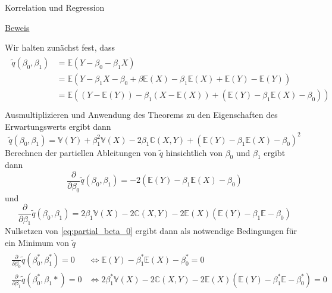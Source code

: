 \documentclass[
  8pt,
  ignorenonframetext,
]{beamer}
\begin{document}
\begin{frame}{Korrelation und Regression}
\protect\hypertarget{korrelation-und-regression-4}{}
\tiny
{}
\tiny
\setlength{\abovedisplayskip}{3pt}
\setlength{\belowdisplayskip}{3pt}

\underline{Beweis}

Wir halten zunächst fest, dass \begin{align}
\begin{split}
\tilde{q}(\beta_0,\beta_1)
& = \mathbb{E}\left(Y - \beta_0 - \beta_1 X \right) \\
& = \mathbb{E}\left(Y - \beta_1 X - \beta_0 + \beta\mathbb{E}(X) - \beta_1\mathbb{E}(X) + \mathbb{E}(Y) - \mathbb{E}(Y) \right) \\
& = \mathbb{E}\left((Y - \mathbb{E}(Y)) - \beta_1(X - \mathbb{E}(X)) + (\mathbb{E}(Y) - \beta_1\mathbb{E}(X) - \beta_0)\right) \\
\end{split}
\end{align} Ausmultiplizieren und Anwendung des Theorems zu den
Eigenschaften des Erwartungswerts ergibt dann \begin{equation}
\tilde{q}(\beta_0,\beta_1) = \mathbb{V}(Y) + \beta_1^2 \mathbb{V}(X) - 2 \beta_1 \mathbb{C}(X,Y) + \left(\mathbb{E}(Y) - \beta_1 \mathbb{E}(X) - \beta_0\right)^2
\end{equation} Berechnen der partiellen Ableitungen von \(\tilde{q}\)
hinsichtlich von \(\beta_0\) und \(\beta_1\) ergibt dann
\begin{equation}\label{eq:partial_beta_0}
\frac{\partial}{\partial \beta_0}\tilde{q}(\beta_0,\beta_1) = -2\left(\mathbb{E}(Y) - \beta_1 \mathbb{E}(X) - \beta_0\right)
\end{equation} und \begin{equation}
\frac{\partial}{\partial \beta_1}\tilde{q}(\beta_0,\beta_1) = 2\beta_1\mathbb{V}(X) - 2\mathbb{C}(X,Y) - 2\mathbb{E}(X)\left(\mathbb{E}(Y) - \beta_1\mathbb{E} - \beta_0\right)
\end{equation} Nullsetzen von \eqref{eq:partial_beta_0} ergibt dann als
notwendige Bedingungen für ein Minimum von \(\tilde{q}\) \begin{align}
\begin{split}
\frac{\partial}{\partial \beta_0}\tilde{q}(\beta_0^*,\beta_1^*)     = 0
& \Leftrightarrow
\mathbb{E}(Y) - \beta_1^* \mathbb{E}(X) - \beta_0^* = 0 \\
\frac{\partial}{\partial \beta_1}\tilde{q}(\beta_0^*,\beta_1*)  = 0
& \Leftrightarrow
2\beta_1^*\mathbb{V}(X) - 2\mathbb{C}(X,Y) - 2\mathbb{E}(X)\left(\mathbb{E}(Y) - \beta_1^*\mathbb{E} - \beta_0^*\right) = 0

\end{split}
\end{align}
\end{frame}
\end{document}
